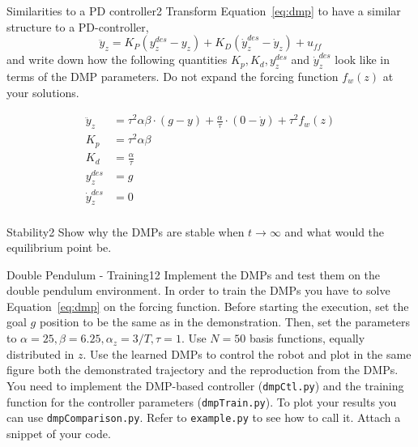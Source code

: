 \begin{questions}


\begin{question}{Similarities to a PD controller}{2}
Transform Equation~\eqref{eq:dmp} to have a similar structure to a PD-controller,
%
\begin{equation}
    \ddot{y}_z = K_P ( y^{des}_z - y_z ) + K_D ( \dot{y}_z^{des} - \dot{y}_z ) +
    u_{ff}
\end{equation}
%
and write down how the following quantities $K_p, K_d, y^{des}_z$ and $\dot{y}_z^{des}$ look like in terms of the DMP parameters. Do not expand the forcing function $f_w(z)$ at your solutions.

\begin{answer}
\begin{align*}
	\ddot{y}_{z} & = \tau^2\alpha\beta\cdot (g-y) + \frac{\alpha}{\tau}\cdot(0-\dot{y}) + \tau^2 f_{w}(z)\\
	K_p & = \tau^2\alpha\beta\\
	K_d & = \frac{\alpha}{\tau}\\
	y_{z}^{des} & = g\\
	\dot{y}_{z}^{des} & = 0\\
\end{align*}
\end{answer}

\end{question}


\begin{question}{Stability}{2}
Show why the DMPs are stable when $t\to\infty$ and what would the equilibrium point be.

\begin{answer}\end{answer}

\end{question}


\begin{question}{Double Pendulum - Training}{12}
Implement the DMPs and test them on the double pendulum environment.
In order to train the DMPs you have to solve Equation~\eqref{eq:dmp} on the forcing function. Before starting the execution, set the goal $g$ position to be the same as in the demonstration. Then, set the parameters to $\alpha=25, \beta=6.25, \alpha_z=3/T, \tau=1$. Use $N=50$ basis functions, equally distributed in $z$.  Use the learned DMPs to control the robot and plot in the same figure both the demonstrated trajectory and the reproduction from the DMPs.
You need to implement the DMP-based controller (\texttt{dmpCtl.py}) and the training function for the controller parameters (\texttt{dmpTrain.py}). To plot your results you can use \texttt{dmpComparison.py}. Refer to \texttt{example.py} to see how to call it. Attach a snippet of your code.


\end{question}
\end{questions}
